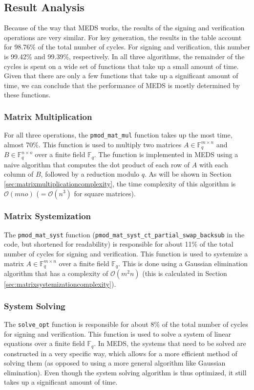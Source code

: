 \documentclass[11pt,a4paper]{report}
\theoremstyle{definition}
\begin{document}
\subsection{Result Analysis}
Because of the way that MEDS works, the results of the signing and verification operations are very similar. For key generation, the results in the table account for 98.76\% of the total number of cycles. For signing and verification, this number is 99.42\% and 99.39\%, respectively. In all three algorithms, the remainder of the cycles is spent on a wide set of functions that take up a small amount of time. Given that there are only a few functions that take up a significant amount of time, we can conclude that the performance of MEDS is mostly determined by these functions.

\subsubsection{Matrix Multiplication}
For all three operations, the \texttt{pmod\_mat\_mul} function takes up the most time, almost 70\%. This function is used to multiply two matrices $A \in \mathbb{F}_q^{m \times n}$ and $B \in \mathbb{F}_q^{n \times o}$ over a finite field $\mathbb{F}_q$. The function is implemented in MEDS using a naive algorithm that computes the dot product of each row of $A$ with each column of $B$, followed by a reduction modulo $q$. As will be shown in Section \ref{sec:matrixmultiplicationcomplexity}, the time complexity of this algorithm is $\mathcal{O}(mno)$ ($= \mathcal{O}(n^3)$ for square matrices).

\subsubsection{Matrix Systemization}
The \texttt{pmod\_mat\_syst} function (\texttt{pmod\_mat\_syst\_ct\_partial\_swap\_backsub} in the code, but shortened for readability) is responsible for about 11\% of the total number of cycles for signing and verification. This function is used to systemize a matrix $A \in \mathbb{F}_q^{m \times n}$ over a finite field $\mathbb{F}_q$. This is done using a Gaussian elimination algorithm that has a complexity of $\mathcal{O}(m^2n)$ (this is calculated in Section \ref{sec:matrixsystemizationcomplexity}).

\subsubsection{System Solving}
The \texttt{solve\_opt} function is responsible for about 8\% of the total number of cycles for signing and verification. This function is used to solve a system of linear equations over a finite field $\mathbb{F}_q$. In MEDS, the systems that need to be solved are constructed in a very specific way, which allows for a more efficient method of solving them (as opposed to using a more general algorithm like Gaussian elimination). Even though the system solving algorithm is thus optimized, it still takes up a significant amount of time.
\end{document}
